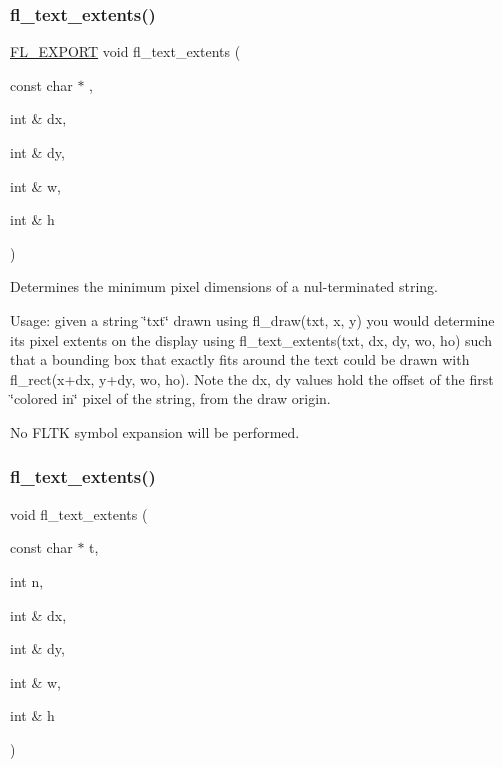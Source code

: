 \subsubsection{\texorpdfstring{fl\+\_\+text\+\_\+extents()}{fl\_text\_extents()}\hspace{0.1cm}{\footnotesize\ttfamily [1/2]}}
{\footnotesize\ttfamily \hyperlink{_fl___export_8_h_aa9ba29a18aee9d738370a06eeb4470fc}{F\+L\+\_\+\+E\+X\+P\+O\+RT} void fl\+\_\+text\+\_\+extents (\begin{DoxyParamCaption}\item[{const char $\ast$}]{,  }\item[{int \&}]{dx,  }\item[{int \&}]{dy,  }\item[{int \&}]{w,  }\item[{int \&}]{h }\end{DoxyParamCaption})}

Determines the minimum pixel dimensions of a nul-\/terminated string.

Usage\+: given a string \char`\"{}txt\char`\"{} drawn using fl\+\_\+draw(txt, x, y) you would determine its pixel extents on the display using fl\+\_\+text\+\_\+extents(txt, dx, dy, wo, ho) such that a bounding box that exactly fits around the text could be drawn with fl\+\_\+rect(x+dx, y+dy, wo, ho). Note the dx, dy values hold the offset of the first \char`\"{}colored in\char`\"{} pixel of the string, from the draw origin.

No F\+L\+TK symbol expansion will be performed. \mbox{\label{group__fl__attributes_gaa52f1ed8201b9d89c2b2edbaed80e907}} 
\subsubsection{\texorpdfstring{fl\+\_\+text\+\_\+extents()}{fl\_text\_extents()}\hspace{0.1cm}{\footnotesize\ttfamily [2/2]}}
{\footnotesize\ttfamily void fl\+\_\+text\+\_\+extents (\begin{DoxyParamCaption}\item[{const char $\ast$}]{t,  }\item[{int}]{n,  }\item[{int \&}]{dx,  }\item[{int \&}]{dy,  }\item[{int \&}]{w,  }\item[{int \&}]{h }\end{DoxyParamCaption})\hspace{0.3cm}{\ttfamily [inline]}}

